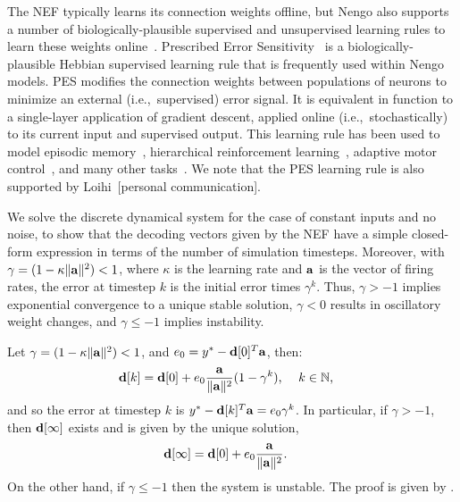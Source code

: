 The NEF typically learns its connection weights offline, but Nengo also supports a number of biologically-plausible supervised and unsupervised learning rules to learn these weights online~\citep{bekolay2011a}.
Prescribed Error Sensitivity~\citep[PES;][]{bekolay2013} is a biologically-plausible Hebbian supervised learning rule that is frequently used within Nengo models.
PES modifies the connection weights between populations of neurons to minimize an external (i.e.,~supervised) error signal.
It is equivalent in function to a single-layer application of gradient descent, applied online (i.e.,~stochastically) to its current input and supervised output.
This learning rule has been used to model episodic memory~\citep{trujillo2014}, hierarchical reinforcement learning~\citep{rasmussen2017}, adaptive motor control~\citep{komer2015, dewolf2016}, and many other tasks~\citep{aubin2018, choo2018}.
We note that the PES learning rule is also supported by Loihi~[personal communication].

We solve the discrete dynamical system for the case of constant inputs and no noise, to show that the decoding vectors given by the NEF have a simple closed-form expression in terms of the number of simulation timesteps. Moreover, with $\gamma = (1 - \kappa \|\mathbf{a}\|^2) < 1$, where $\kappa$ is the learning rate and $\mathbf{a}$ is the vector of firing rates, the error at timestep $k$ is the initial error times $\gamma^k$. Thus, $\gamma > - 1$ implies exponential convergence to a unique stable solution, $\gamma < 0 $ results in oscillatory weight changes, and $\gamma \le -1$ implies instability.
\begin{lemma}
\label{lemma:pes-dynamics}
{\normalfont \citep{voelker2015}}
Let $\gamma = (1 - \kappa \|\mathbf{a}\|^2) < 1$, and $e_0 = y^* - \mathbf{d}[0]^T \mathbf{a}$, then:
\begin{align}
\label{eq:dk}
\mathbf{d}[k] &= \mathbf{d}[0] + e_0\frac{\mathbf{a}}{\|\mathbf{a}\|^2} (1 - \gamma^k)\text{, \quad $k \in \mathbb{N}$} \text{,}
\end{align}
and so the error at timestep $k$ is $y^* - \mathbf{d}[k]^T \mathbf{a} = e_0\gamma^k$. In particular, if $\gamma > - 1$, then $\mathbf{d}[\infty]$ exists and is given by the unique solution,
\begin{align}
\label{eq:dinf}
\mathbf{d}[\infty] &= \mathbf{d}[0] + e_0\frac{\mathbf{a}}{\|\mathbf{a}\|^2} .
\end{align}
On the other hand, if $\gamma \le -1$ then the system is unstable.
The proof is given by \citet{voelker2015}.
\end{lemma}

